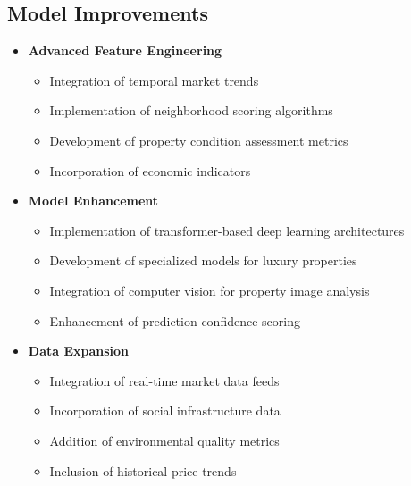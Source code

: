 \documentclass[12pt,a4paper]{report}
\begin{document}
\subsection{Model Improvements}
\begin{itemize}
    \item \textbf{Advanced Feature Engineering}
    \begin{itemize}
        \item Integration of temporal market trends
        \item Implementation of neighborhood scoring algorithms
        \item Development of property condition assessment metrics
        \item Incorporation of economic indicators
    \end{itemize}

    \item \textbf{Model Enhancement}
    \begin{itemize}
        \item Implementation of transformer-based deep learning architectures
        \item Development of specialized models for luxury properties
        \item Integration of computer vision for property image analysis
        \item Enhancement of prediction confidence scoring
    \end{itemize}

    \item \textbf{Data Expansion}
    \begin{itemize}
        \item Integration of real-time market data feeds
        \item Incorporation of social infrastructure data
        \item Addition of environmental quality metrics
        \item Inclusion of historical price trends
    \end{itemize}
\end{itemize}
\end{document}
